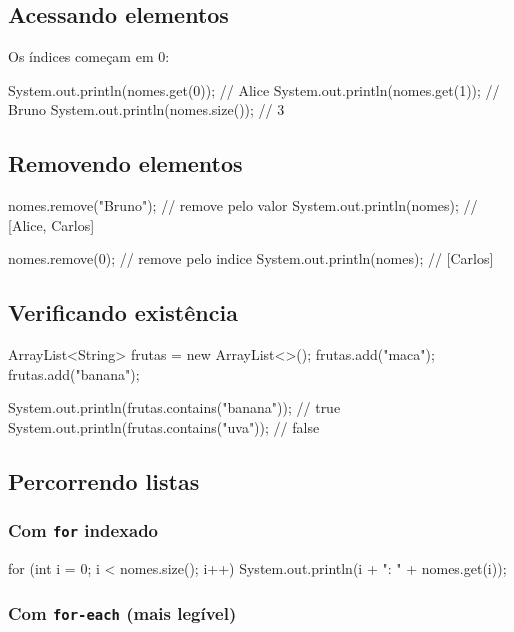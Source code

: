 \documentclass[12pt, a4paper]{article}
\begin{document}
\subsection{Acessando elementos}

Os índices começam em 0:

\begin{javacode}
System.out.println(nomes.get(0)); // Alice
System.out.println(nomes.get(1)); // Bruno
System.out.println(nomes.size()); // 3
\end{javacode}

\subsection{Removendo elementos}

\begin{javacode}
nomes.remove("Bruno");        // remove pelo valor
System.out.println(nomes);    // [Alice, Carlos]

nomes.remove(0);              // remove pelo indice
System.out.println(nomes);    // [Carlos]
\end{javacode}

\subsection{Verificando existência}

\begin{javacode}
ArrayList<String> frutas = new ArrayList<>();
frutas.add("maca");
frutas.add("banana");

System.out.println(frutas.contains("banana")); // true
System.out.println(frutas.contains("uva"));    // false
\end{javacode}

\subsection{Percorrendo listas}

\subsubsection{Com \texttt{for} indexado}

\begin{javacode}
for (int i = 0; i < nomes.size(); i++) {
    System.out.println(i + ": " + nomes.get(i));
}
\end{javacode}

\subsubsection{Com \texttt{for-each} (mais legível)}
\end{document}
